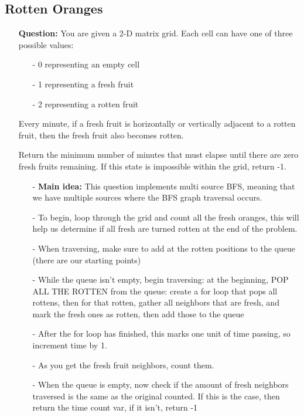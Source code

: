 \documentclass[12pt]{article}
\begin{document}
\subsection{Rotten Oranges}
\begin{enumerate}
  \item[] \textbf{Question:} You are given a 2-D matrix grid. Each cell can have one of three possible values:

    \begin{enumerate}
      \item[-] 0 representing an empty cell
      \item[-] 1 representing a fresh fruit
      \item[-] 2 representing a rotten fruit
    \end{enumerate}
    Every minute, if a fresh fruit is horizontally or vertically adjacent to a rotten fruit, then the fresh fruit also becomes rotten.

Return the minimum number of minutes that must elapse until there are zero fresh fruits remaining. If this state is impossible within the grid, return -1.

    \begin{enumerate}
      \item[-] \textbf{Main idea:} This question implements multi source BFS, meaning that we have multiple sources where the BFS graph traversal occurs. 
      \item[-] To begin, loop through the grid and count all the fresh oranges, this will help us determine if all fresh are turned rotten at the end of the problem.
      \item[-] When traversing, make sure to add at the rotten positions to the queue (there are our starting points)
      \item[-] While the queue isn't empty, begin traversing: at the beginning, POP ALL THE ROTTEN from the queue: create a for loop that pops all rottens, then for that rotten, gather all neighbors that are fresh, and mark the fresh ones as rotten, then add those to the queue
      \item[-] After the for loop has finished, this marks one unit of time passing, so increment time by 1. 
      \item[-] As you get the fresh fruit neighbors, count them.
      \item[-] When the queue is empty, now check if the amount of fresh neighbors traversed is the same as the original counted. If this is the case, then return the time count var, if it isn't, return -1
    \end{enumerate}
\end{enumerate}
\end{document}
